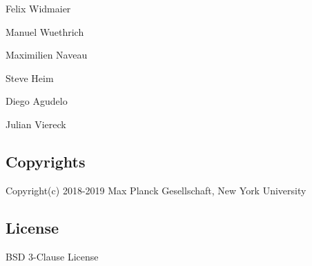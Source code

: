 \begin{DoxyItemize}
\item Felix Widmaier
\item Manuel Wuethrich
\item Maximilien Naveau
\item Steve Heim
\item Diego Agudelo
\item Julian Viereck
\end{DoxyItemize}

\subsection*{Copyrights }

Copyright(c) 2018-\/2019 Max Planck Gesellschaft, New York University

\subsection*{License }

B\+SD 3-\/\+Clause License 